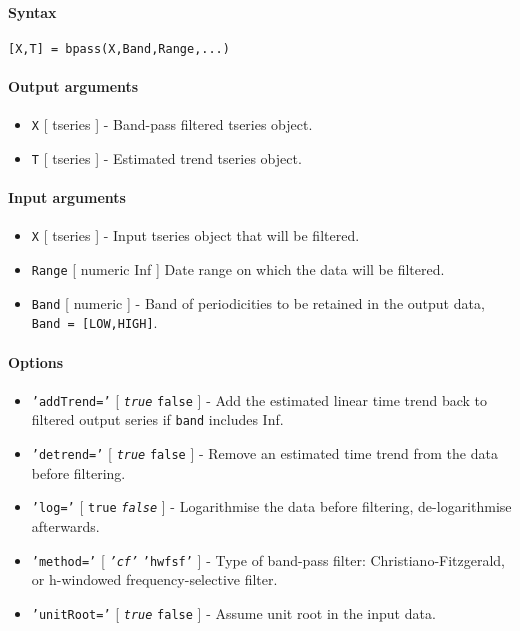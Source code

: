 


	\paragraph{Syntax}

\begin{verbatim}
[X,T] = bpass(X,Band,Range,...)
\end{verbatim}

\paragraph{Output arguments}

\begin{itemize}
\item
  \texttt{X} {[} tseries {]} - Band-pass filtered tseries object.
\item
  \texttt{T} {[} tseries {]} - Estimated trend tseries object.
\end{itemize}

\paragraph{Input arguments}

\begin{itemize}
\item
  \texttt{X} {[} tseries {]} - Input tseries object that will be
  filtered.
\item
  \texttt{Range} {[} numeric \textbar{} Inf {]} Date range on which the
  data will be filtered.
\item
  \texttt{Band} {[} numeric {]} - Band of periodicities to be retained
  in the output data, \texttt{Band = {[}LOW,HIGH{]}}.
\end{itemize}

\paragraph{Options}

\begin{itemize}
\item
  \texttt{'addTrend='} {[} \emph{\texttt{true}} \textbar{}
  \texttt{false} {]} - Add the estimated linear time trend back to
  filtered output series if \texttt{band} includes Inf.
\item
  \texttt{'detrend='} {[} \emph{\texttt{true}} \textbar{} \texttt{false}
  {]} - Remove an estimated time trend from the data before filtering.
\item
  \texttt{'log='} {[} \texttt{true} \textbar{} \emph{\texttt{false}} {]}
  - Logarithmise the data before filtering, de-logarithmise afterwards.
\item
  \texttt{'method='} {[} \emph{\texttt{'cf'}} \textbar{}
  \texttt{'hwfsf'} {]} - Type of band-pass filter:
  Christiano-Fitzgerald, or h-windowed frequency-selective filter.
\item
  \texttt{'unitRoot='} {[} \emph{\texttt{true}} \textbar{}
  \texttt{false} {]} - Assume unit root in the input data.
\end{itemize}

